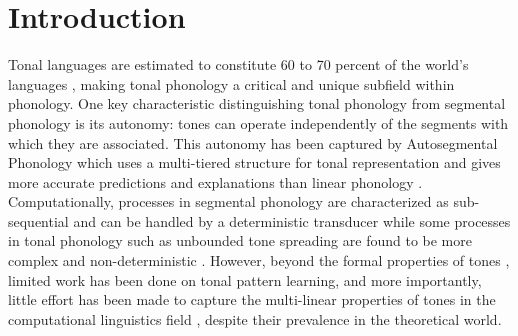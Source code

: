 \chapter{Introduction}
\label{chap:intro}
Tonal languages are estimated to constitute 60 to 70 percent of the world's languages \citep{yip2002tone}, making tonal phonology a critical and unique subfield within phonology. One key characteristic distinguishing tonal phonology from segmental phonology is its autonomy: tones can operate independently of the segments with which they are associated. This autonomy has been captured by Autosegmental Phonology which uses a multi-tiered structure for tonal representation \citep{goldsmith1976autosegmental} and gives more accurate predictions and explanations than linear phonology \citep{clements1984autosegmental,oddenbook}. Computationally, processes in segmental phonology are characterized as sub-sequential and can be handled by a deterministic transducer \citep{heinz2013vowel} while some processes in tonal phonology such as unbounded tone spreading are found to be more complex and non-deterministic \citep{jardine16dissertation,jardine2017LocalNature}. However, beyond the formal properties of tones \citep{bird1990phonological,coleman1991no,kornai2018formal,jardine2015concatenation}, limited work has been done on tonal pattern learning, and more importantly, little effort has been made to capture the multi-linear properties of tones in the computational linguistics field \citep{albro1994amar,kornai2018formal}, despite their prevalence in the theoretical world.

